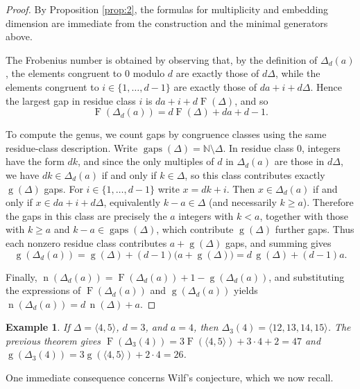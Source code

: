 \documentclass[12pt,a4paper]{amsart}
\newtheorem{example}[theorem]{Example}
\theoremstyle{definition}
\theoremstyle{remark}
\begin{document}
\begin{proof}
By Proposition \ref{prop:2}, the formulas for multiplicity and embedding dimension are immediate from the construction and the minimal generators above.

The Frobenius number is obtained by observing that, by the definition of \(\Delta_d(a)\), the elements congruent to \(0\) modulo \(d\) are exactly those of \(d\Delta\), while the elements congruent to \(i\in\{1,\dots,d-1\}\) are exactly those of \(da+i+d\Delta\). Hence the largest gap in residue class \(i\) is \(da+i+d\operatorname{F}(\Delta)\), and so \[ \operatorname{F}(\Delta_d(a))=d\operatorname{F}(\Delta)+da+d-1. \]

To compute the genus, we count gaps by congruence classes using the same residue-class description. Write $\operatorname{gaps}(\Delta)=\mathbb{N}\setminus \Delta$. In residue class $0$, integers have the form $dk$, and since the only multiples of $d$ in $\Delta_d(a)$ are those in $d\Delta$, we have $dk\in \Delta_d(a)$ if and only if $k\in \Delta$, so this class contributes exactly $\operatorname{g}(\Delta)$ gaps. For $i\in\{1,\dots,d-1\}$ write $x=dk+i$. Then $x\in \Delta_d(a)$ if and only if $x\in da+i+d\Delta$, equivalently $k-a\in \Delta$ (and necessarily $k\ge a$). Therefore the gaps in this class are precisely the $a$ integers with $k<a$, together with those with $k\ge a$ and $k-a\in\operatorname{gaps}(\Delta)$, which contribute $\operatorname{g}(\Delta)$ further gaps. Thus each nonzero residue class contributes $a+\operatorname{g}(\Delta)$ gaps, and summing gives
\[
\operatorname{g}(\Delta_d(a))=\operatorname{g}(\Delta)+(d-1)\bigl(a+\operatorname{g}(\Delta)\bigr)=d\,\operatorname{g}(\Delta)+(d-1)a.
\]

Finally, $\operatorname{n}(\Delta_d(a))=\operatorname{F}(\Delta_d(a))+1-\operatorname{g}(\Delta_d(a))$, and substituting the expressions of $\operatorname{F}(\Delta_d(a))$ and $\operatorname{g}(\Delta_d(a))$ yields $\operatorname{n}(\Delta_d(a))=d\,\operatorname{n}(\Delta)+a$.
\end{proof}

\begin{example}
If $\Delta=\langle 4,5\rangle$, $d=3$, and $a=4$, then $\Delta_3(4)=\langle 12,13,14,15\rangle$. The previous theorem gives $\operatorname{F}(\Delta_3(4))=3\operatorname{F}(\langle 4,5\rangle)+3\cdot 4+2=47$ and $\operatorname{g}(\Delta_3(4))=3\operatorname{g}(\langle 4,5\rangle)+2\cdot 4=26$.
\end{example}

One immediate consequence concerns Wilf's conjecture, which we now recall.
\end{document}
